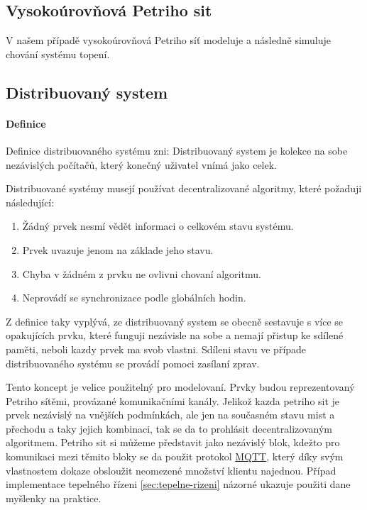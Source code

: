 \subsection{Vysokoúrovňová Petriho sit}

V našem případě vysokoúrovňová Petriho síť modeluje a následně simuluje chování systému topení.

\subsection{Distribuovaný system}
\label{subsec:distr_system}

\paragraph{Definice}

Definice distribuovaného systému zni:
Distribuovaný system je kolekce na sobe nezávislých počítačů, který konečný uživatel vnímá jako celek.

Distribuované systémy musejí používat decentralizované algoritmy, které požaduji následující:
\begin{enumerate}
  \item Žádný prvek nesmí vědět informaci o celkovém stavu systému.
  \item Prvek uvazuje jenom na základe jeho stavu.
  \item Chyba v žádném z prvku ne ovlivni chovaní algoritmu.
  \item Neprovádí se synchronizace podle globálních hodin.
\end{enumerate}

Z definice taky vyplývá, ze distribuovaný system se obecně sestavuje s více se opakujících prvku, které funguji nezávisle na sobe a nemají přistup ke sdílené paměti, neboli kazdy prvek ma svob vlastni. Sdíleni stavu ve případe distribuovaného systému se provádí pomoci zasílaní zprav.

Tento koncept je velice použitelný pro modelovaní. Prvky budou reprezentovaný Petriho sítěmi, provázané komunikačními kanály. Jelikož kazda petriho sit je prvek nezávislý na vnějších podmínkách, ale jen na současném stavu mist a přechodu a taky jejich kombinaci, tak se da to prohlásit decentralizovaným algoritmem. Petriho sit si můžeme představit jako nezávislý blok, kdežto pro komunikaci mezi těmito bloky se da použit protokol \href{http://docs.oasis-open.org/mqtt/mqtt/v3.1.1/csprd02/mqtt-v3.1.1-csprd02.html}{MQTT}, který díky svým vlastnostem dokaze obsloužit neomezené množství klientu najednou. Případ implementace tepelného řízeni \ref{sec:tepelne-rizeni} názorné ukazuje použiti dane myšlenky na praktice.


